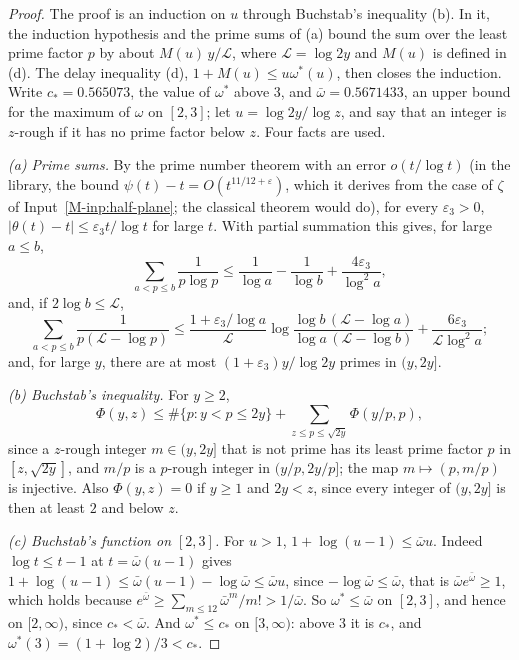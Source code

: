 \documentclass[11pt]{article}
\numberwithin{equation}{section}
\begin{document}
\begin{proof}
The proof is an induction on $u$ through Buchstab's inequality (b). In it, the induction hypothesis and the prime sums
of (a) bound the sum over the least prime factor $p$ by about $M(u)\, y/\mathcal L$, where $\mathcal L = \log 2y$ and
$M(u)$ is defined in (d). The delay inequality (d), $1 + M(u) \le u\omega^*(u)$, then closes the induction. Write $c_*
= 0.565073$, the value of $\omega^*$ above $3$, and $\bar\omega = 0.5671433$, an upper bound for the maximum of
$\omega$ on $[2, 3]$; let $u = \log 2y/\log z$, and say that an integer is $z$-rough if it has no prime factor below
$z$. Four facts are used.

\emph{(a) Prime sums.} By the prime number theorem with an error $o(t/\log t)$ (in the library, the bound
$\psi(t) - t = O(t^{11/12 + \varepsilon})$, which it derives from the case of $\zeta$ of Input~\ref{M-inp:half-plane};
the classical theorem would do), for every $\varepsilon_3 > 0$,
$|\theta(t) - t| \le \varepsilon_3 t/\log t$ for large $t$. With partial summation this gives, for large $a \le b$,
\[
  \sum_{a < p \le b} \frac1{p \log p} \le \frac1{\log a} - \frac1{\log b} + \frac{4\varepsilon_3}{\log^2 a},
\]
and, if $2 \log b \le \mathcal L$,
\[
  \sum_{a < p \le b} \frac1{p(\mathcal L - \log p)}
  \le \frac{1 + \varepsilon_3/\log a}{\mathcal L} \log \frac{\log b \, (\mathcal L - \log a)}{\log a \, (\mathcal L -
  \log b)} + \frac{6\varepsilon_3}{\mathcal L \log^2 a};
\]
and, for large $y$, there are at most $(1 + \varepsilon_3) y/\log 2y$ primes in $(y, 2y]$.

\emph{(b) Buchstab's inequality.} For $y \ge 2$,
\[
  \Phi(y, z) \le \#\{p : y < p \le 2y\} + \sum_{z \le p \le \sqrt{2y}} \Phi(y/p, p),
\]
since a $z$-rough integer $m \in (y, 2y]$ that is not prime has its least prime factor $p$ in $[z, \sqrt{2y}]$, and
$m/p$ is a $p$-rough integer in $(y/p, 2y/p]$; the map $m \mapsto (p, m/p)$ is injective. Also $\Phi(y, z) = 0$ if
$y \ge 1$ and $2y < z$, since every integer of $(y, 2y]$ is then at least $2$ and below $z$.

\emph{(c) Buchstab's function on $[2, 3]$.} For $u > 1$, $1 + \log(u - 1) \le \bar\omega u$. Indeed $\log t \le t - 1$
at $t = \bar\omega(u - 1)$ gives $1 + \log(u - 1) \le \bar\omega(u - 1) - \log \bar\omega \le \bar\omega u$, since
$-\log \bar\omega \le \bar\omega$, that is $\bar\omega e^{\bar\omega} \ge 1$, which holds because $e^{\bar\omega} \ge
\sum_{m \le 12} \bar\omega^m/m! > 1/\bar\omega$. So $\omega^* \le \bar\omega$ on $[2, 3]$, and hence on $[2, \infty)$,
since $c_* < \bar\omega$. And $\omega^* \le c_*$ on $[3, \infty)$: above $3$ it is $c_*$, and $\omega^*(3) = (1 + \log
2)/3 < c_*$.


\end{proof}
\end{document}
